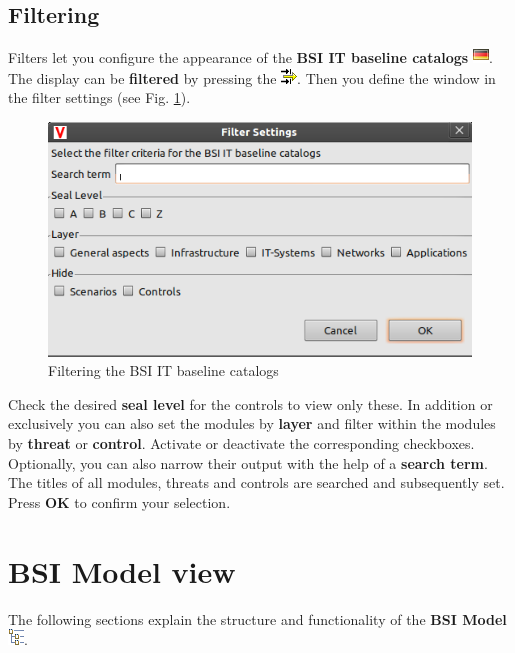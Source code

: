 \documentclass[a4paper,10pt]{book}
\begin{document}
\subsection{Filtering}
Filters let you configure the appearance of the \textbf{BSI IT baseline catalogs} \includegraphics[height=2ex]{Icon/GS_Kataloge.png}.
The display can be \textbf{filtered} by pressing the \includegraphics[height=2ex]{Icon/Filter.png}.
Then you define the window in the filter settings (see Fig. \ref{Filtering the BSI IT baseline catalogs}).
\newline
\begin{figure}[htb!]
  \centering
  \includegraphics[scale=.50]{Screenshot/Filtern_kataloge-en.png}
  \caption{\label{Filtering the BSI IT baseline catalogs} Filtering the BSI IT baseline catalogs}
\end{figure}
\newline
Check the desired \textbf{seal level} for the controls to view only these.
\newline
In addition or exclusively you can also set the modules by \textbf{layer} and filter within the modules by \textbf{threat} or \textbf{control}.
Activate or deactivate the corresponding checkboxes. Optionally, you can also narrow their output with the help of a \textbf{search term}. The titles of all modules, threats and controls are searched and subsequently set. Press \textbf{OK} to confirm your selection.

\section{BSI Model view}
The following sections explain the structure and functionality of the \textbf{BSI Model}
\includegraphics[height=2ex]{Icon/GS_Modell.png}.
\end{document}
